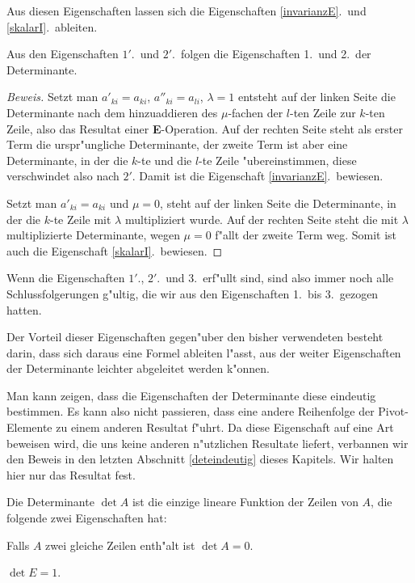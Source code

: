 Aus diesen Eigenschaften lassen sich die Eigenschaften \ref{invarianzE}.~und
\ref{skalarI}.~ableiten.

\begin{hilfssatz} Aus den Eigenschaften $1'$.~und $2'$.~folgen die Eigenschaften
1.~und 2.~der Determinante.
\end{hilfssatz}
\begin{proof}[Beweis]
Setzt man 
$a'_{ki}=a_{ki}$, $a''_{ki}=a_{li}$, $\lambda=1$ entsteht auf der linken Seite
die Determinante nach dem hinzuaddieren des $\mu$-fachen der $l$-ten Zeile
zur $k$-ten Zeile, also das Resultat einer {\bf E}-Operation.
Auf der rechten Seite steht als erster Term die urspr"ungliche Determinante,
der zweite Term ist aber eine Determinante, in der die $k$-te und die
$l$-te Zeile "ubereinstimmen, diese verschwindet also nach $2'$.
Damit ist die Eigenschaft \ref{invarianzE}.~bewiesen.

Setzt man $a'_{ki}=a_{ki}$ und $\mu=0$, steht auf der linken Seite
die Determinante, in der die $k$-te Zeile mit $\lambda$ multipliziert
wurde.
Auf der rechten Seite steht die mit $\lambda$ multiplizierte
Determinante, wegen $\mu=0$ f"allt der zweite Term weg.
Somit ist auch die Eigenschaft \ref{skalarI}.~bewiesen.
\end{proof}

Wenn die Eigenschaften $1'$., $2'$.~und 3.~erf"ullt sind, sind also immer
noch alle Schlussfolgerungen g"ultig, die wir aus den Eigenschaften
1.~bis 3.~gezogen hatten.

Der Vorteil dieser Eigenschaften gegen"uber den bisher verwendeten
besteht darin, dass sich daraus eine Formel ableiten l"asst, aus
der weiter Eigenschaften der Determinante leichter abgeleitet
werden k"onnen. 

Man kann zeigen, dass die Eigenschaften der Determinante diese
eindeutig bestimmen.
Es kann also nicht passieren, dass eine andere
Reihenfolge der Pivot-Elemente zu einem anderen Resultat f"uhrt.
Da diese Eigenschaft auf eine Art beweisen wird, die uns keine
anderen n"utzlichen Resultate liefert, verbannen wir den Beweis
in den letzten Abschnitt \ref{deteindeutig} dieses Kapitels.
Wir halten hier nur das Resultat fest.

\begin{satz}
\label{detcharacterisation}
Die Determinante
$\det A$
ist die einzige lineare Funktion der Zeilen von $A$, die folgende zwei
Eigenschaften hat:
\begin{compactenum}
\item Falls $A$ zwei gleiche Zeilen enth"alt ist $\det A=0$.
\item $\det E = 1$.
\end{compactenum}
\end{satz}

